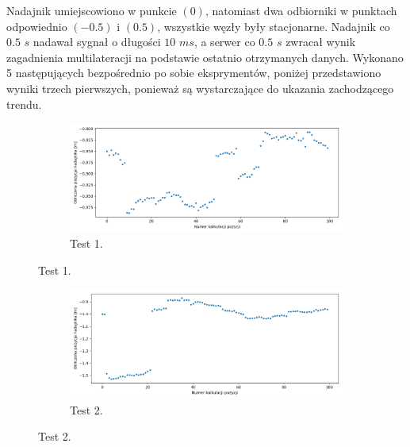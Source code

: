 Nadajnik umiejscowiono w punkcie $(0)$, natomiast dwa odbiorniki w punktach odpowiednio $(-0.5)$ i $(0.5)$, wszystkie węzły były stacjonarne. Nadajnik co $0.5$ $s$ nadawał sygnał o długości $10$ $ms$, a serwer co $0.5$ $s$ zwracał wynik zagadnienia multilateracji na podstawie ostatnio otrzymanych danych. Wykonano 5 następujących bezpośrednio po sobie eksprymentów, poniżej przedstawiono wyniki trzech pierwszych, ponieważ są wystarczające do ukazania zachodzącego trendu.

\begin{figure}[H]
    \centering
    \begin{subfigure}{\textwidth}\label{fig:position_0}
        \centering
        \includegraphics[width=\linewidth]{pics/position/position_0.png}
        \caption{Test 1.}
    \end{subfigure}
\end{figure}
\begin{figure}[H]
    \ContinuedFloat\centering
    \begin{subfigure}{\textwidth}\label{fig:position_1}
        \centering
        \includegraphics[width=\linewidth]{pics/position/position_1.png}
        \caption{Test 2.}
    \end{subfigure}
\end{figure}
